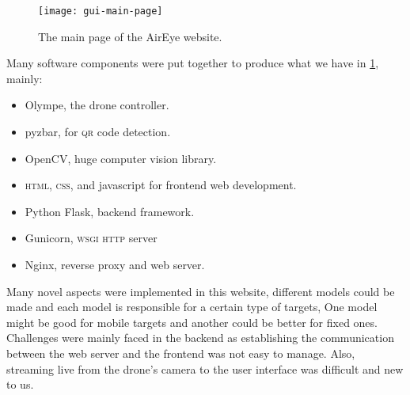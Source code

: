 \documentclass[../main.tex]{subfiles}
\begin{document}
\begin{figure}[tbp]
	\centering
	\texttt{[image: gui-main-page]}
	\caption{The main page of the AirEye website.}
	\label{fig:gui-main-page}
\end{figure}

Many software components were put together to produce what we have in \cref{fig:gui-main-page}, mainly: 
\begin{itemize}
	\item Olympe, the drone controller. 
	\item pyzbar, for \textsc{qr} code detection.
	\item OpenCV, huge computer vision library.
	\item \textsc{html}, \textsc{css}, and javascript for frontend web 
	development.
	\item Python Flask, backend framework.
	\item Gunicorn, \textsc{wsgi} \textsc{http} server
	\item Nginx, reverse proxy and web server. 
\end{itemize}

Many novel aspects were implemented in this website, different models could be 
made and each model is responsible for a certain type of targets, One model 
might be good for mobile targets and another could be better for fixed ones. 
Challenges were mainly faced in the backend as establishing the communication 
between the web server and the frontend was not easy to manage. Also, 
streaming live from the drone's camera to the user interface was 
difficult and new to us.
\end{document}
